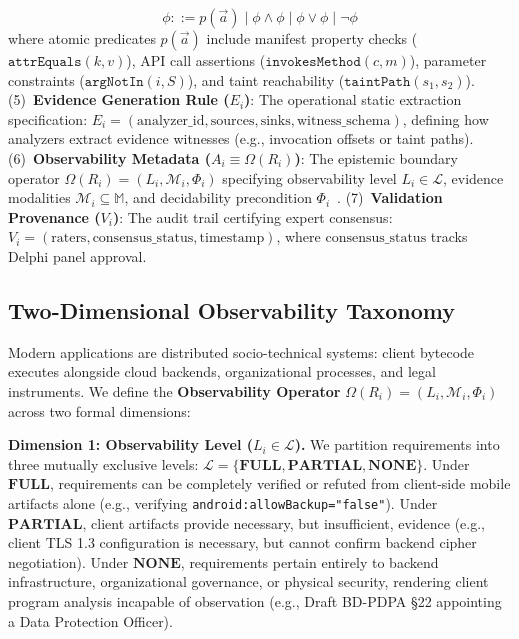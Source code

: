 \begin{equation}
\label{eq:predicate_grammar}
\phi ::= p(\vec{a}) \mid \phi \wedge \phi \mid \phi \vee \phi \mid \neg \phi
\end{equation}
where atomic predicates $p(\vec{a})$ include manifest property checks ($\texttt{attrEquals}(k, v)$), API call assertions ($\texttt{invokesMethod}(c, m)$), parameter constraints ($\texttt{argNotIn}(i, S)$), and taint reachability ($\texttt{taintPath}(s_1, s_2)$).
(5)~\textbf{Evidence Generation Rule ($E_i$)}: The operational static extraction specification: $E_i = (\text{analyzer\_id}, \text{sources}, \text{sinks}, \text{witness\_schema})$, defining how analyzers extract evidence witnesses (e.g., invocation offsets or taint paths).
(6)~\textbf{Observability Metadata ($A_i \equiv \Omega(R_i)$)}: The epistemic boundary operator $\Omega(R_i) = (L_i, \mathcal{M}_i, \Phi_i)$ specifying observability level $L_i \in \mathcal{L}$, evidence modalities $\mathcal{M}_i \subseteq \mathbb{M}$, and decidability precondition $\Phi_i$~\cite{fagin_epistemic_logic}.
(7)~\textbf{Validation Provenance ($V_i$)}: The audit trail certifying expert consensus: $V_i = (\text{raters}, \text{consensus\_status}, \text{timestamp})$, where $\text{consensus\_status}$ tracks Delphi panel approval.

\subsection{Two-Dimensional Observability Taxonomy}
\label{sec:formal:observability}

Modern applications are distributed socio-technical systems: client bytecode executes alongside cloud backends, organizational processes, and legal instruments. We define the \textbf{Observability Operator} $\Omega(R_i) = (L_i, \mathcal{M}_i, \Phi_i)$ across two formal dimensions:

\noindent\textbf{Dimension 1: Observability Level ($L_i \in \mathcal{L}$).} We partition requirements into three mutually exclusive levels: $\mathcal{L} = \{\mathbf{FULL}, \mathbf{PARTIAL}, \mathbf{NONE}\}$. Under $\mathbf{FULL}$, requirements can be completely verified or refuted from client-side mobile artifacts alone (e.g., verifying \texttt{android:allowBackup="false"}). Under $\mathbf{PARTIAL}$, client artifacts provide necessary, but insufficient, evidence (e.g., client TLS 1.3 configuration is necessary, but cannot confirm backend cipher negotiation). Under $\mathbf{NONE}$, requirements pertain entirely to backend infrastructure, organizational governance, or physical security, rendering client program analysis incapable of observation (e.g., Draft BD-PDPA §22 appointing a Data Protection Officer).

